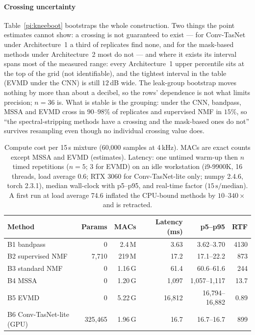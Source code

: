 \documentclass[conference]{IEEEtran}
\begin{document}
\paragraph{Crossing uncertainty}
Table~\ref{pi:kneeboot} bootstraps the whole construction. Two things the point estimates cannot show: a crossing is not guaranteed to exist --- for Conv-TasNet under Architecture~1 a third of replicates find none, and for the mask-based methods under Architecture~2 most do not --- and where it exists its interval spans most of the measured range: every Architecture~1 upper percentile sits at the top of the grid (not identifiable), and the tightest interval in the table (EVMD under the CNN) is still $12$\,dB wide. The leak-group bootstrap moves nothing by more than about a decibel, so the rows' dependence is not what limits precision; $n{=}36$ is. What is stable is the grouping: under the CNN, bandpass, MSSA and EVMD cross in $90$--$98\%$ of replicates and supervised NMF in $15\%$, so ``the spectral-stripping methods have a crossing and the mask-based ones do not'' survives resampling even though no individual crossing value does.

\begin{table}[htbp]
\centering
\caption{Compute cost per 15\,s mixture (60{,}000 samples at 4\,kHz). MACs are exact counts except MSSA and EVMD (estimates). Latency: one untimed warm-up then $n$ timed repetitions ($n{=}5$; 3 for EVMD) on an idle workstation (i9-9900K, 16 threads, load average 0.6; RTX 3060 for Conv-TasNet-lite only; numpy 2.4.6, torch 2.3.1), median wall-clock with p5--p95, and real-time factor ($15\,\text{s}/\text{median}$). A first run at load average 74.6 inflated the CPU-bound methods by $10$--$340\times$ and is retracted.}
\label{pi:compute}
\footnotesize\setlength{\tabcolsep}{3.5pt}
\begin{tabular}{@{}lrrrrr@{}}
\toprule
Method & Params & MACs & Latency (ms) & p5--p95 & RTF \\
\midrule
B1 bandpass        & 0        & 2.4\,M  & 3.63 & 3.62--3.70 & 4130 \\
B2 supervised NMF  & 7{,}710  & 219\,M  & 17.2 & 17.1--22.2 & 873 \\
B3 standard NMF    & 0        & 1.16\,G & 61.4 & 60.6--61.6 & 244 \\
B4 MSSA            & 0        & 1.20\,G & 1{,}097 & 1{,}057--1{,}117 & 13.7 \\
B5 EVMD            & 0        & 5.22\,G & 16{,}812 & 16{,}794--16{,}882 & 0.89 \\
B6 Conv-TasNet-lite (GPU) & 325{,}465 & 1.96\,G & 16.7 & 16.7--16.7 & 899 \\
\bottomrule
\end{tabular}
\end{table}
\end{document}
